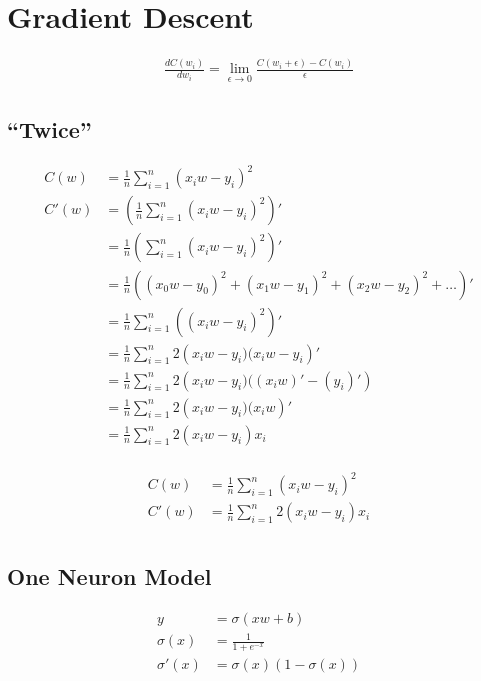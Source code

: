 \documentclass{article}
\begin{document}
\section{Gradient Descent}

\begin{align}
    \frac{dC(w_i)}{dw_i} = \lim_{\epsilon \to 0}\frac{C(w_i + \epsilon) - C(w_i)}{\epsilon}
\end{align}

\subsection{``Twice''}

\begin{align}
    C(w) &= \frac{1}{n} \sum_{i=1}^{n} (x_i w - y_i)^2 \\
    C'(w) 
	&= \left(\frac{1}{n} \sum_{i=1}^{n} (x_i w - y_i)^2\right)' \\
	&= \frac{1}{n}\left(\sum_{i=1}^{n} (x_i w - y_i)^2\right)' \\
	&= \frac{1}{n}\left((x_0 w - y_0)^2 + (x_1 w - y_1)^2 + (x_2 w - y_2)^2 + \hdots \right)' \\
	&= \frac{1}{n}\sum_{i=1}^{n} \left((x_i w - y_i)^2\right)' \\
	&= \frac{1}{n}\sum_{i=1}^{n} 2\left(x_i w - y_i) (x_i w - y_i\right)' \\
	&= \frac{1}{n}\sum_{i=1}^{n} 2\left(x_i w - y_i) ((x_i w)' - (y_i)'\right) \\
	&= \frac{1}{n}\sum_{i=1}^{n} 2\left(x_i w - y_i) (x_i w \right)' \\
	&= \frac{1}{n}\sum_{i=1}^{n} 2\left(x_i w - y_i\right)x_i \\
\end{align}

\begin{align}
	C(w) &= \frac{1}{n} \sum_{i=1}^{n} (x_i w - y_i)^2 \\
	C'(w) &= \frac{1}{n}\sum_{i=1}^{n} 2\left(x_i w - y_i\right)x_i \\
\end{align}

\subsection{One Neuron Model}


\begin{align}
	y &= \sigma(xw + b) \\
	\sigma(x) &= \frac{1}{1 + e^{-x}} \\
	\sigma'(x) &= \sigma(x) (1-\sigma(x)) \\
\end{align}
\end{document}
